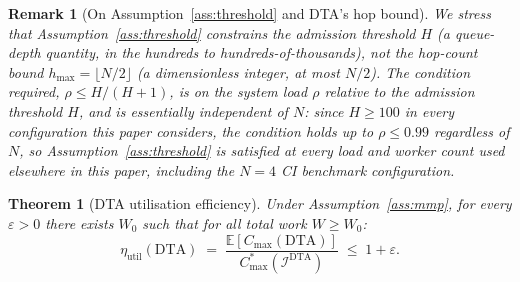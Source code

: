 \documentclass[11pt,a4paper]{report}
\newtheorem{theorem}{Theorem}[section]
\newtheorem{remark}{Remark}[section]
\begin{document}
\begin{remark}[On Assumption~\ref{ass:threshold} and DTA's hop bound]
We stress that Assumption~\ref{ass:threshold} constrains the
\emph{admission} threshold $H$ (a queue-depth quantity, in the hundreds
to hundreds-of-thousands), not the \emph{hop-count} bound $h_{\max} =
\lfloor N/2\rfloor$ (a dimensionless integer, at most $N/2$). The
condition required, $\rho \leq H/(H+1)$, is on the \emph{system load}
$\rho$ relative to the admission threshold $H$, and is essentially
independent of $N$: since $H \geq 100$ in every configuration this
paper considers, the condition holds up to $\rho \leq 0.99$ regardless
of $N$, so Assumption~\ref{ass:threshold} is satisfied at every load
and worker count used elsewhere in this paper, including the $N=4$ CI
benchmark configuration.
\end{remark}

\begin{theorem}[DTA utilisation efficiency]\label{thm:dta_info_opt}
Under Assumption~\ref{ass:mmp}, for every $\varepsilon > 0$ there exists
$W_0$ such that for all total work $W \geq W_0$:
\[
  \eta_{\mathrm{util}}(\mathrm{DTA})
  \;=\;
  \frac{\mathbb{E}[C_{\max}(\mathrm{DTA})]}{C_{\max}^*(\mathcal{I}^{\mathrm{DTA}})}
  \;\leq\; 1 + \varepsilon.
\]
\end{theorem}
\end{document}
